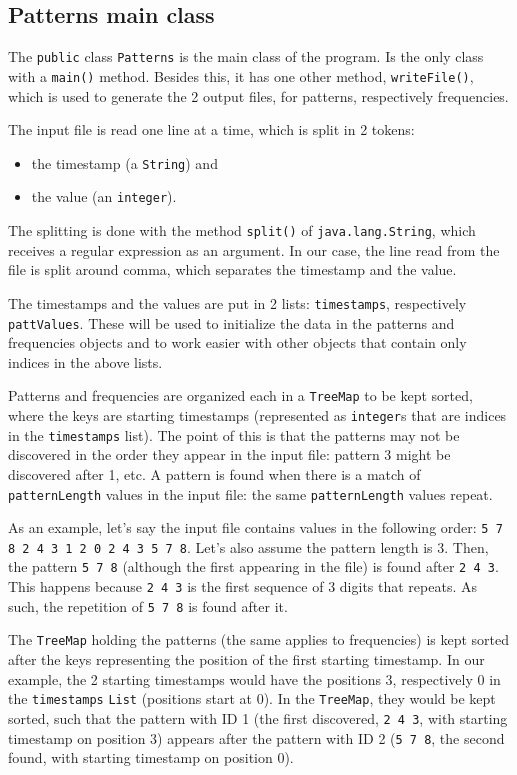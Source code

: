 \documentclass[a4paper,12pt]{article}
\begin{document}
  \hypertarget{patt}{\subsection{Patterns main class}}
  
  The \verb/public/ class \verb/Patterns/ is the main class of the program.
  Is the only class with a \verb/main()/ method. Besides this, it has one other method,
  \verb/writeFile()/, which is used to generate the 2 output files, for patterns, respectively
  frequencies.
  
  \noindent
  The input file is read one line at a time, which is split in 2 tokens:
  \begin{itemize}
   \item the timestamp (a \verb/String/) and
   \item the value (an \verb/integer/).
  \end{itemize}

  The splitting is done with the method \verb/split()/ of \verb/java.lang.String/, which
  receives a regular expression as an argument. In our case, the line read from the file
  is split around comma, which separates the timestamp and the value.
  
  The timestamps and the values are put in 2 lists: \verb/timestamps/, respectively
  \verb/pattValues/. These will be used to initialize the data in the patterns and
  frequencies objects and to work easier with other objects that contain only indices
  in the above lists.
  
  Patterns and frequencies are organized each in a \verb/TreeMap/ to be kept sorted,
  where the keys are starting timestamps (represented as \verb/integer/s that are
  indices in the \verb/timestamps/ list). The point of this is that the patterns may not
  be discovered in the order they appear in the input file: pattern 3 might be discovered
  after 1, etc. A pattern is found when there is a match of \verb/patternLength/ values
  in the input file: the same \verb/patternLength/ values repeat.
  
  As an example, let's say the input file contains values in the following order:
  \verb/5 7 8 2 4 3 1 2 0 2 4 3 5 7 8/. Let's also assume the pattern length is 3.
  Then, the pattern \verb/5 7 8/ (although the first appearing in the file) is found after
  \verb/2 4 3/. This happens because \verb/2 4 3/ is the first sequence of 3 digits that repeats.
  As such, the repetition of \verb/5 7 8/ is found after it.
  
  The \verb/TreeMap/ holding the patterns (the same applies to frequencies) is kept sorted
  after the keys representing the position of the first starting timestamp. In our example,
  the 2 starting timestamps would have the positions 3, respectively 0 in the \verb/timestamps/
  \verb/List/ (positions start at 0). In the \verb/TreeMap/, they would be kept sorted, such that
  the pattern with ID 1 (the first discovered, \verb/2 4 3/, with starting timestamp on position 3)
  appears after the pattern with ID 2 (\verb/5 7 8/, the second found, with starting timestamp
  on position 0).
  
\end{document}
